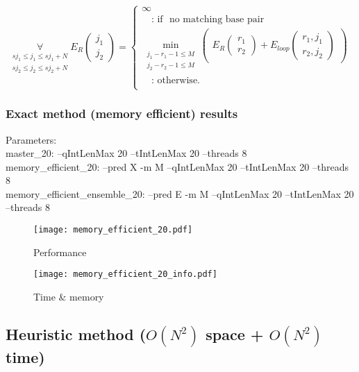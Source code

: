 \begin{equation*}
\underset{\substack{sj_{1} \le j_{1} \le sj_{1}+N\\sj_{2} \le j_{2} \le sj_{2}+N}}{\forall}
E_R(\substack{j_1\\j_2}) = \begin{cases}
\infty\\
\quad\text{: if } \text{ no matching base pair }\\
\min\limits_{\substack{j_{1}-r_{1}-1 \le M\\j_{2}-r_{2}-1 \le M}}
\begin{pmatrix}
E_R(\substack{r_1\\r_2}) + E_{loop}(\substack{r_1,j_1\\r_2,j_2})
\end{pmatrix}\\
\quad\text{: otherwise.}\\

\end{cases}
\end{equation*}

\clearpage

\subsubsection{Exact method (memory efficient) results}

Parameters:\\
master\_20: --qIntLenMax 20 --tIntLenMax 20 --threads 8\\
memory\_efficient\_20: --pred X -m M --qIntLenMax 20 --tIntLenMax 20 --threads 8\\
memory\_efficient\_ensemble\_20: --pred E -m M --qIntLenMax 20 --tIntLenMax 20 --threads 8\\

\begin{figure}[H]
	\centering
	\caption{Performance}
	\texttt{[image: memory\_efficient\_20.pdf]}
\end{figure}

\begin{figure}[H]
	\centering
	\caption{Time \& memory}
	\texttt{[image: memory\_efficient\_20\_info.pdf]}
\end{figure}

\clearpage

\subsection{Heuristic method ($O(N^{2})$ space + $O(N^{2})$ time)}

